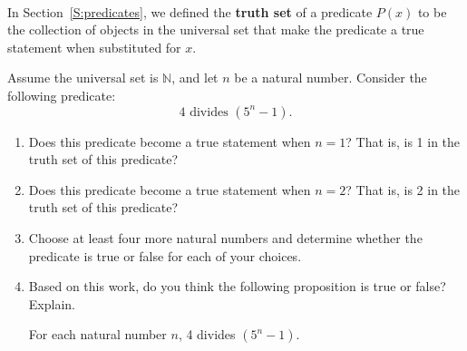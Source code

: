 \begin{previewactivity} \label{PA:dividesconjecture} \hfill \\
In Section~\ref{S:predicates}, we defined the \textbf{truth set}
%
 of a predicate 
$P( x )$ to be the collection of objects in the universal set that make the predicate a true statement when substituted for  $x$.  

Assume the universal set is  $\mathbb{N}$, and let  $n$  be a natural number.  Consider the following predicate:
\[
4 \text{ divides }  \left( {5^n  - 1} \right)\!.
\]
\begin{enumerate}
\item Does this predicate become a true statement when  $n = 1$?  That is, is  1  in the truth set of this predicate?  

\item Does this predicate become a true statement when  $n = 2$?  That is, is  2  in the truth set of this predicate?

\item Choose at least four more natural numbers and determine whether the predicate is true or false for each of your choices.

\item Based on this work, do you think the following proposition is true or false?  Explain.
\begin{center}
For each natural number  $n$, 4  divides  $\left( {5^n  - 1} \right)$.
\end{center}

\end{enumerate}
\end{previewactivity}
\hbreak
\newpage
%
